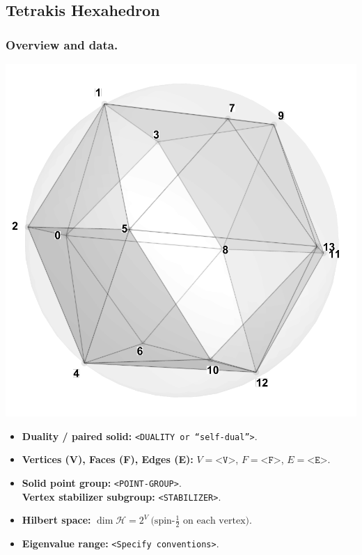 \documentclass[11pt,a4paper]{article}
\begin{document}

\subsection*{Tetrakis Hexahedron}

\subsubsection*{Overview and data.}
\begin{center}
  \includegraphics[width=.6\linewidth]{tetrakishexahedron}
\end{center}

\begin{itemize}[leftmargin=1.5em]
  \item \textbf{Duality / paired solid:} \texttt{<DUALITY or “self-dual”>}.
  \item \textbf{Vertices (V), Faces (F), Edges (E):} $V=\texttt{<V>}$,\; $F=\texttt{<F>}$,\; $E=\texttt{<E>}$.
  \item \textbf{Solid point group:} \texttt{<POINT-GROUP>}.\\
        \textbf{Vertex stabilizer subgroup:} \texttt{<STABILIZER>}.
  \item \textbf{Hilbert space:} \(
        \dim\mathcal{H} = 2^{V}\ \text{(spin-$\tfrac12$ on each vertex).}
        \)
  \item \textbf{Eigenvalue range:} \texttt{<Specify conventions>}.
\end{itemize}
\end{document}
